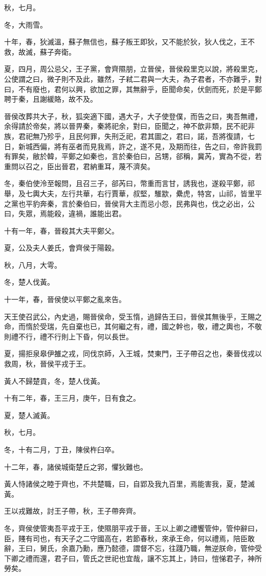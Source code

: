 \begin{pinyinscope}
秋，七月。

冬，大雨雪。

十年，春，狄滅溫，蘇子無信也，蘇子叛王即狄，又不能於狄，狄人伐之，王不救，故滅，蘇子奔衛。

夏，四月，周公忌父，王子黨，會齊隰朋，立晉侯，晉侯殺里克以說，將殺里克，公使謂之曰，微子則不及此，雖然，子弒二君與一大夫，為子君者，不亦難乎，對曰，不有廢也，君何以興，欲加之罪，其無辭乎，臣聞命矣，伏劍而死，於是平鄭聘于秦，且謝緩賂，故不及。

晉侯改葬共大子，秋，狐突適下國，遇大子，大子使登僕，而告之曰，夷吾無禮，余得請於帝矣，將以晉畀秦，秦將祀余，對曰，臣聞之，神不歆非類，民不祀非族，君祀無乃殄乎，且民何罪，失刑乏祀，君其圖之，君曰，諾，吾將復請，七日，新城西偏，將有巫者而見我焉，許之，遂不見，及期而往，告之曰，帝許我罰有罪矣，敝於韓，平鄭之如秦也，言於秦伯曰，呂甥，郤稱，冀芮，實為不從，若重問以召之，臣出晉君，君納重耳，蔑不濟矣。

冬，秦伯使泠至報問，且召三子，郤芮曰，幣重而言甘，誘我也，遂殺平鄭，祁舉，及七輿大夫，左行共華，右行賈華，叔堅，騅歂，纍虎，特宮，山祁，皆里平之黨也平豹奔秦，言於秦伯曰，晉侯背大主而忌小怨，民弗與也，伐之必出，公曰，失眾，焉能殺，違禍，誰能出君。

十有一年，春，晉殺其大夫平鄭父。

夏，公及夫人姜氏，會齊侯于陽穀。

秋，八月，大雩。

冬，楚人伐黃。

十一年，春，晉侯使以平鄭之亂來告。

天王使召武公，內史過，賜晉侯命，受玉惰，過歸告王曰，晉侯其無後乎，王賜之命，而惰於受瑞，先自棄也已，其何繼之有，禮，國之幹也，敬，禮之輿也，不敬則禮不行，禮不行則上下昏，何以長世。

夏，揚拒泉皋伊雒之戎，同伐京師，入王城，焚東門，王子帶召之也，秦晉伐戎以救周，秋，晉侯平戎于王。

黃人不歸楚貢，冬，楚人伐黃。

十有二年，春，王三月，庚午，日有食之。

夏，楚人滅黃。

秋，七月。

冬，十有二月，丁丑，陳侯杵臼卒。

十二年，春，諸侯城衛楚丘之郛，懼狄難也。

黃人恃諸侯之睦于齊也，不共楚職，曰，自郢及我九百里，焉能害我，夏，楚滅黃。

王以戎難故，討王子帶，秋，王子帶奔齊。

冬，齊侯使管夷吾平戎于王，使隰朋平戎于晉，王以上卿之禮饗管仲，管仲辭曰，臣，賤有司也，有天子之二守國高在，若節春秋，來承王命，何以禮焉，陪臣敢辭，王曰，舅氏，余嘉乃勳，應乃懿德，謂督不忘，往踐乃職，無逆朕命，管仲受下卿之禮而還，君子曰，管氏之世祀也宜哉，讓不忘其上，詩曰，愷悌君子，神所勞矣。


\end{pinyinscope}
